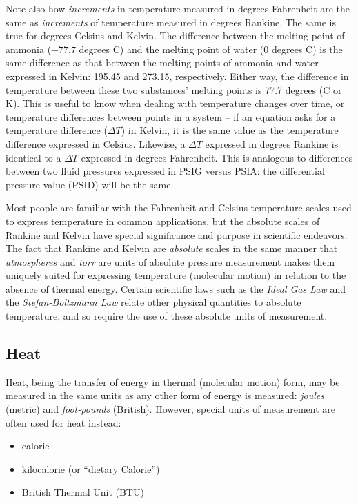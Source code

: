 Note also how \textit{increments} in temperature measured in degrees Fahrenheit are the same as \textit{increments} of temperature measured in degrees Rankine.  The same is true for degrees Celsius and Kelvin.  The difference between the melting point of ammonia ($-77.7$ degrees C) and the melting point of water (0 degrees C) is the same difference as that between the melting points of ammonia and water expressed in Kelvin: 195.45 and 273.15, respectively.  Either way, the difference in temperature between these two substances' melting points is 77.7 degrees (C or K).  This is useful to know when dealing with temperature changes over time, or temperature differences between points in a system -- if an equation asks for a temperature difference ($\Delta T$) in Kelvin, it is the same value as the temperature difference expressed in Celsius.  Likewise, a $\Delta T$ expressed in degrees Rankine is identical to a $\Delta T$ expressed in degrees Fahrenheit.  This is analogous to differences between two fluid pressures expressed in PSIG versus PSIA: the differential pressure value (PSID) will be the same.

Most people are familiar with the Fahrenheit and Celsius temperature scales used to express temperature in common applications, but the absolute scales of Rankine and Kelvin have special significance and purpose in scientific endeavors.  The fact that Rankine and Kelvin are \textit{absolute} scales in the same manner that \textit{atmospheres} and \textit{torr} are units of absolute pressure measurement makes them uniquely suited for expressing temperature (molecular motion) in relation to the absence of thermal energy.  Certain scientific laws such as the \textit{Ideal Gas Law} and the \textit{Stefan-Boltzmann Law} relate other physical quantities to absolute temperature, and so require the use of these absolute units of measurement.





\filbreak
\subsection{Heat}

Heat, being the transfer of energy in thermal (molecular motion) form, may be measured in the same units as any other form of energy is measured: \textit{joules} (metric) and \textit{foot-pounds} (British).  However, special units of measurement are often used for heat instead:

\begin{itemize}
\item calorie
\item kilocalorie (or ``dietary Calorie'')
\item British Thermal Unit (BTU) 
\end{itemize}        

